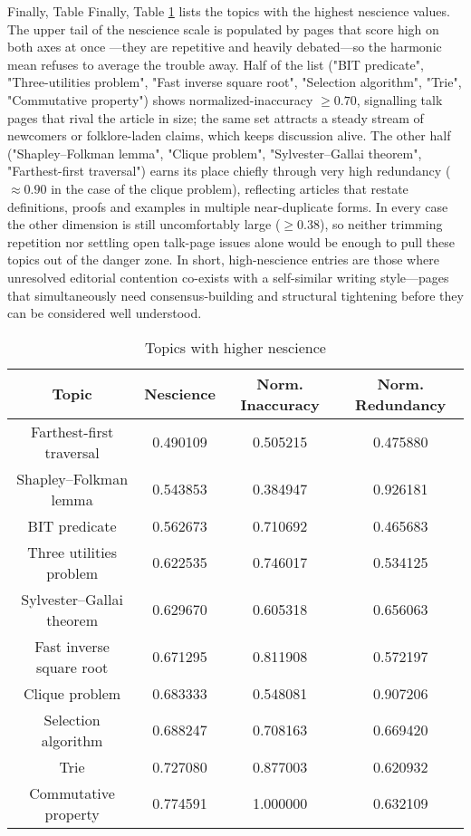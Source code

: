 Finally, Table Finally, Table \ref{tab:Higher-nescience-of-topics} lists the topics with the highest nescience values. The upper tail of the nescience scale is populated by pages that score high on both axes at once —they are repetitive and heavily debated—so the harmonic mean refuses to average the trouble away.  Half of the list ("BIT predicate", "Three-utilities problem", "Fast inverse square root", "Selection algorithm", "Trie", "Commutative property") shows normalized-inaccuracy $\geq 0.70$, signalling talk pages that rival the article in size; the same set attracts a steady stream of newcomers or folklore-laden claims, which keeps discussion alive.  The other half ("Shapley–Folkman lemma", "Clique problem", "Sylvester–Gallai theorem", "Farthest-first traversal") earns its place chiefly through very high redundancy ($\approx 0.90$ in the case of the clique problem), reflecting articles that restate definitions, proofs and examples in multiple near-duplicate forms.  In every case the other dimension is still uncomfortably large ($\geq 0.38$), so neither trimming repetition nor settling open talk-page issues alone would be enough to pull these topics out of the danger zone.  In short, high-nescience entries are those where unresolved editorial contention co-exists with a self-similar writing style—pages that simultaneously need consensus-building and structural tightening before they can be considered well understood.

\begin{table}
\begin{centering}
\begin{tabular}{|c|c|c|c|}
\hline 
Topic & Nescience & Norm. Inaccuracy & Norm. Redundancy \tabularnewline
\hline 
\hline
Farthest-first traversal & 0.490109 & 0.505215 & 0.475880 \tabularnewline
\hline
Shapley–Folkman lemma & 0.543853 & 0.384947 & 0.926181 \tabularnewline
\hline
BIT predicate & 0.562673 & 0.710692 & 0.465683 \tabularnewline
\hline
Three utilities problem & 0.622535 & 0.746017 & 0.534125 \tabularnewline
\hline
Sylvester–Gallai theorem & 0.629670 & 0.605318 & 0.656063 \tabularnewline
\hline
Fast inverse square root & 0.671295 & 0.811908 & 0.572197 \tabularnewline
\hline
Clique problem & 0.683333 & 0.548081 & 0.907206 \tabularnewline
\hline
Selection algorithm & 0.688247 & 0.708163 & 0.669420 \tabularnewline
\hline
Trie & 0.727080 & 0.877003 & 0.620932 \tabularnewline
\hline
Commutative property & 0.774591 & 1.000000 & 0.632109 \tabularnewline
\hline 
\end{tabular}
\par\end{centering}
\caption{\label{tab:Higher-nescience-of-topics}Topics with higher nescience}
\end{table}

